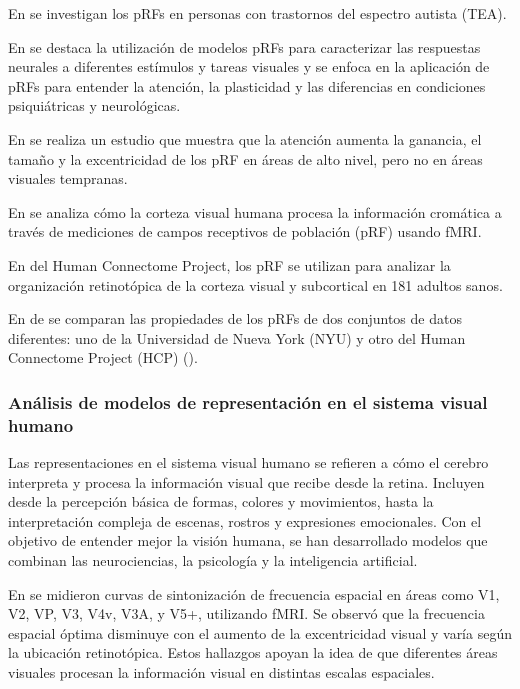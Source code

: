 En \cite{schwarzkopf_larger_2014} se investigan los pRFs en personas con trastornos del espectro autista (TEA). 

En \cite{wandell_computational_2015} se destaca la utilizaci\'on de modelos pRFs para caracterizar las respuestas neurales a diferentes est\'imulos y tareas visuales y se enfoca en la aplicación de pRFs para entender la atención, la plasticidad y las diferencias en condiciones psiquiátricas y neurológicas.

En \cite{kay_attention_2015} se realiza un estudio que muestra que la atención aumenta la ganancia, el tamaño y la excentricidad de los pRF en áreas de alto nivel, pero no en áreas visuales tempranas.

En \cite{welbourne_population_2018} se analiza cómo la corteza visual humana procesa la información cromática a través de mediciones de campos receptivos de población (pRF) usando fMRI. 

En \cite{benson_human_2018} del Human Connectome Project, los pRF se utilizan para analizar la organización retinotópica de la corteza visual y subcortical en 181 adultos sanos. 

En de \cite{himmelberg_cross-dataset_2021} se comparan las propiedades de los pRFs de dos conjuntos de datos diferentes: uno de la Universidad de Nueva York (NYU) y otro del Human Connectome Project (HCP) (\cite{benson_human_2018}).  



\subsubsection*{An\'alisis de modelos de representaci\'on en el sistema visual humano}

Las representaciones en el sistema visual humano se refieren a cómo el cerebro interpreta y procesa la información visual que recibe desde la retina. Incluyen desde la percepción básica de formas, colores y movimientos, hasta la interpretación compleja de escenas, rostros y expresiones emocionales. Con el objetivo de entender mejor la visi\'on humana, se han desarrollado modelos que combinan las neurociencias, la psicología y la inteligencia artificial.

En \cite{henriksson_spatial_2008}  se midieron curvas de sintonización de frecuencia espacial en áreas como V1, V2, VP, V3, V4v, V3A, y V5+, utilizando fMRI. Se observ\'o que la frecuencia espacial óptima disminuye con el aumento de la excentricidad visual y varía según la ubicación retinotópica. Estos hallazgos apoyan la idea de que diferentes áreas visuales procesan la información visual en distintas escalas espaciales.

